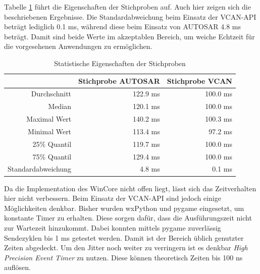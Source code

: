 \documentclass[
  a4paper,					    %
  twoside,
  DIV=calc,     				%
  bibliography=totoc,
  cleardoublepage=empty,
  ngerman,     					%
  final       					%
]{scrbook}
\begin{document}
Tabelle \ref{tab:jitter_statistik} führt die Eigenschaften der Stichproben auf. Auch hier zeigen sich die beschriebenen Ergebnisse. Die Standardabweichung beim Einsatz der VCAN-API beträgt lediglich 0.1 ms, während diese beim Einsatz von AUTOSAR 4.8 ms beträgt. Damit sind beide Werte im akzeptablen Bereich, um weiche Echtzeit für die vorgesehenen Anwendungen zu ermöglichen.

\begin{table}[ht]
    \centering
    \begin{tabular}[h]{r  r r}
            & Stichprobe AUTOSAR & Stichprobe VCAN\\
        \toprule
        Durchschnitt        & 122.9 ms & 100.0 ms\\
        Median              & 120.1 ms & 100.0 ms\\
        Maximal Wert        & 140.2 ms & 100.3 ms\\
        Minimal Wert        & 113.4 ms & 97.2 ms\\
        25\% Quantil        & 119.7 ms & 100.0 ms\\
        75\% Quantil        & 129.4 ms & 100.0 ms\\
        Standardabweichung  & 4.8 ms & 0.1 ms\\
        \bottomrule
    \end{tabular}
    \caption{Statistische Eigenschaften der Stichproben}
    \label{tab:jitter_statistik}
\end{table}

Da die Implementation des WinCore nicht offen liegt, lässt sich das Zeitverhalten hier nicht verbessern. Beim Einsatz der VCAN-API sind jedoch einige Möglichkeiten denkbar. Bisher wurden wxPython und pygame eingesetzt, um konstante Timer zu erhalten. Diese sorgen dafür, dass die Ausführungszeit nicht zur Wartezeit hinzukommt. Dabei konnten mittels pygame zuverlässig Sendezyklen bis 1 ms getestet werden. Damit ist der Bereich üblich genutzter Zeiten abgedeckt. Um den Jitter noch weiter zu verringern ist es denkbar \emph{High Precision Event Timer} zu nutzen. Diese können theoretisch Zeiten bis 100 ns auflösen.



\end{document}
